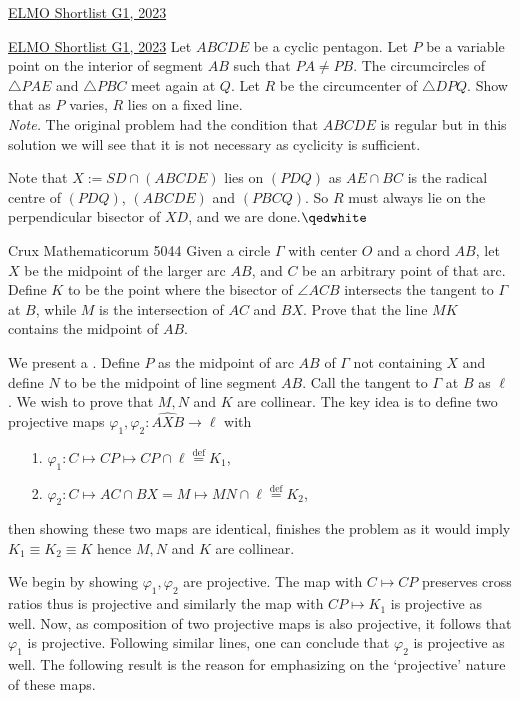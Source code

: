 \begin{problem}{14}{\href{https://artofproblemsolving.com/community/c6h3100572p28033718}{ELMO Shortlist G1, 2023}}
\begin{problem}{14}{\href{https://artofproblemsolving.com/community/c6h3100572p28033718}{ELMO Shortlist G1, 2023}} 
	Let $ABCDE$ be a cyclic pentagon. Let $P$ be a variable point on the interior of segment $AB$ such that $PA\ne PB$. The circumcircles of $\triangle PAE$ and $\triangle PBC$ meet again at $Q$. Let $R$ be the circumcenter of $\triangle DPQ$. Show that as $P$ varies, $R$ lies on a fixed line.\\
	\emph{Note.} The original problem had the condition that $ABCDE$ is regular but in this solution we will see that it is not necessary as cyclicity is sufficient.
	\begin{solution} Note that $X:=SD\cap (ABCDE)$ lies on $(PDQ)$ as $AE\cap BC$ is the radical centre of $(PDQ)$, $(ABCDE)$ and $(PBCQ)$. So $R$ must always lie on the perpendicular bisector of $XD$, and we are done.$\qedwhite$
	\end{solution}
\end{problem}

\begin{problem}{15}{Crux Mathematicorum 5044} Given a circle $\Gamma$ with center $O$ and a chord $AB$, let $X$ be the midpoint of the larger arc $AB$, and $C$ be an arbitrary point of that arc. Define $K$ to be the point where the bisector of $\angle ACB$ intersects the tangent to $\Gamma$ at $B$, while $M$ is the intersection of $AC$ and $BX$. Prove that the line $MK$ contains the midpoint of $AB$.
	\begin{solution} We present a . Define $P$ as the midpoint of arc $AB$ of $\Gamma$ not containing $X$ and define $N$ to be the midpoint of line segment $AB$. Call the tangent to $\Gamma$ at $B$ as $\ell$. We wish to prove that $M, N$ and $K$ are collinear. The key idea is to define two projective maps $\varphi_1, \varphi_2 : \widehat{AXB} \to \ell$ with
	
	\begin{itemize}
		\item[{1.}] $\varphi_1 : C \mapsto CP \mapsto CP \cap \ell \overset{\text{def}}{=} K_1$, 
		\item[{2.}] $\varphi_2 : C \mapsto AC \cap BX = M \mapsto MN \cap \ell \overset{\text{def}}{=} K_2$,
	\end{itemize} 
	\noindent then showing these two maps are identical, finishes the problem as it would imply $K_1 \equiv K_2 \equiv K$ hence $M, N$ and $K$ are collinear.
	\par We begin by showing $\varphi_1, \varphi_2$ are projective. The map with $C \mapsto CP$ 
preserves cross ratios thus is projective and similarly the map with $CP \mapsto K_1$ 
is projective as well. Now, as composition of two projective maps is also projective, 
it follows that $\varphi_1$ is projective. Following similar lines, one can conclude 
that $\varphi_2$ is projective as well. The following result is the reason for 
emphasizing on the `projective' nature of these maps.
	

\end{solution}
\end{problem}
\end{problem}
